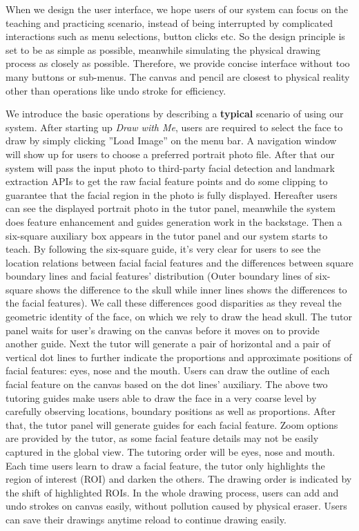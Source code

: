 		When we design the user interface, we hope users of our system can focus on the teaching and practicing scenario, instead of being interrupted by complicated interactions such as menu selections, button clicks etc. So the design principle is set to be as simple as possible, meanwhile simulating the physical drawing process as closely as possible. Therefore, we provide concise interface without too many buttons or sub-menus. The canvas and pencil are closest to physical reality other than operations like undo stroke for efficiency.
			
		
		We introduce the basic operations by describing a \textbf{typical} scenario of using our system. After starting up \textit{Draw with Me}, users are required to select the face to draw by simply clicking ''Load Image'' on the menu bar. A navigation window will show up for users to choose a preferred portrait photo file. After that our system will pass the input photo to third-party  facial detection and landmark extraction APIs to get the raw facial feature points and do some clipping to guarantee that the facial region in the photo is fully displayed. Hereafter users can see the displayed portrait photo in the tutor panel, meanwhile the system does feature enhancement and guides generation work in the backstage. Then a six-square auxiliary box appears in the tutor panel and our system starts to teach. By following the six-square guide, it's very clear for users to see the location relations between facial facial features and the differences between square boundary lines and facial features' distribution (Outer boundary lines of six-square shows the difference to the skull while inner lines shows the differences to the facial features). We call these differences good disparities as they reveal the geometric identity of the face, on which we rely to draw the head skull. The tutor panel waits for user's drawing on the canvas before it moves on to provide another guide. Next the tutor will generate a pair of horizontal and a pair of vertical dot lines to further indicate the proportions and approximate positions of facial features: eyes, nose and the mouth. Users can draw the outline of each facial feature on the canvas based on the dot lines' auxiliary. The above two tutoring guides make users able to draw the face in a very coarse level by carefully observing locations, boundary positions as well as proportions. After that, the tutor panel will generate guides for each facial feature. Zoom options are provided by the tutor, as some facial feature details may not be easily captured in the global view. The tutoring order will be eyes, nose and mouth. Each time users learn to draw a facial feature, the tutor only highlights the region of interest (ROI) and darken the others. The drawing order is indicated by the shift of highlighted ROIs. In the whole drawing process, users can add and undo strokes on canvas easily, without pollution caused by physical eraser. Users can save their drawings anytime reload to continue drawing easily.
		
